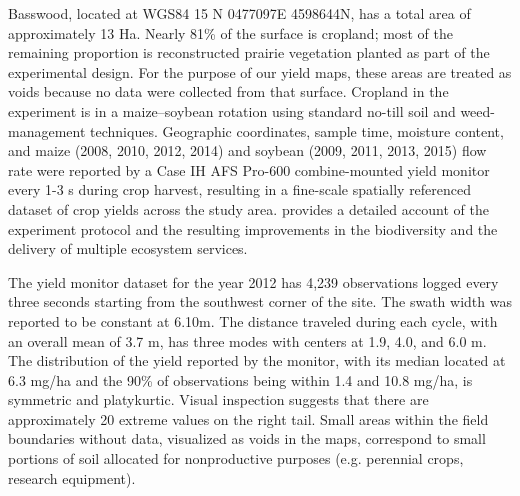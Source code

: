 \documentclass[12pt]{article}
\begin{document}
Basswood, located at WGS84 15 N
0477097E 4598644N, has a total area of approximately 13 Ha. Nearly
81\% of the surface is cropland; most of the remaining proportion is
reconstructed prairie vegetation planted as part of the experimental
design. For the purpose of our yield maps, these areas are treated as
voids because no data were collected from that surface. Cropland in the
experiment is in a maize–soybean rotation using standard no-till soil
and weed-management techniques. Geographic coordinates, sample time,
moisture content, and maize (2008, 2010, 2012, 2014) and soybean (2009,
2011, 2013, 2015) flow rate were reported by a Case IH AFS Pro-600
combine-mounted yield monitor every 1-3 s during crop harvest,
resulting in a fine-scale spatially referenced dataset of crop yields
across the study area. \cite{Schulte2017} provides a detailed account
of the experiment protocol and the resulting improvements in the
biodiversity and the delivery of multiple ecosystem services.

The yield monitor dataset for the year 2012
has 4,239 observations logged every three seconds starting from the
southwest corner of the site. The swath width was reported to be
constant at 6.10m. The distance traveled during each cycle, with
an overall mean of 3.7 m, has three modes with centers at 1.9, 4.0,
and 6.0 m. The distribution of the yield reported by the monitor, with
its median located at 6.3 mg/ha and the 90\% of observations being
within 1.4 and 10.8 mg/ha, is symmetric and platykurtic. Visual
inspection suggests that there are approximately 20 extreme values on
the right tail. Small areas within the field boundaries without data,
visualized as voids in the maps, correspond to small portions of soil
allocated for nonproductive purposes (e.g. perennial crops, research
equipment).
\end{document}
